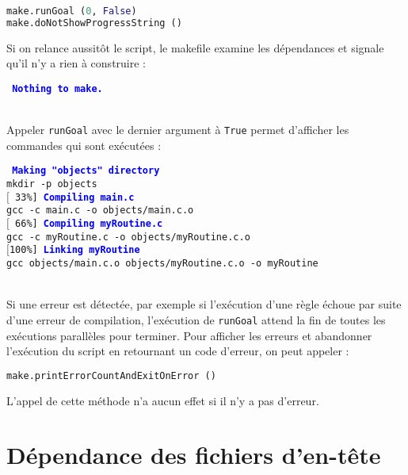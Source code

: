 \documentclass[a4paper,11pt]{extarticle}
\begin{document}
\begin{lstlisting}[language=py]
make.runGoal (0, False)
make.doNotShowProgressString ()
\end{lstlisting}





Si on relance aussitôt le script, le makefile examine les dépendances et signale qu'il n'y a rien à construire :

\begin{mdframed}[hidealllines=true,backgroundcolor=lightgray!20]
\tt\footnotesize
\textcolor{blue}{\bf Nothing to make.}
\end{mdframed}



~\\Appeler \texttt{runGoal} avec le dernier argument à \texttt{True} permet d'afficher les commandes qui sont exécutées :

\begin{mdframed}[hidealllines=true,backgroundcolor=lightgray!20]
\tt\footnotesize
\textcolor{blue}{\bf Making "objects" directory}\\
mkdir -p objects\\
$[$~33\%]~\textcolor{blue}{\bf Compiling main.c}\\
gcc -c main.c -o objects/main.c.o\\
$[$~66\%]~\textcolor{blue}{\bf Compiling myRoutine.c}\\
gcc -c myRoutine.c -o objects/myRoutine.c.o\\
$[$100\%]~\textcolor{blue}{\bf Linking myRoutine}\\
gcc objects/main.c.o objects/myRoutine.c.o -o myRoutine
\end{mdframed}

~\\Si une erreur est détectée, par exemple si l'exécution d'une règle échoue par suite d'une erreur de compilation, l'exécution de \texttt{runGoal} attend la fin de toutes les exécutions parallèles pour terminer. Pour afficher les erreurs et abandonner l'exécution du script en retournant un code d'erreur, on peut appeler :
\begin{lstlisting}[language=py]
make.printErrorCountAndExitOnError ()
\end{lstlisting}
L'appel de cette méthode n'a aucun effet si il n'y a pas d'erreur.

\section{Dépendance des fichiers d'en-tête}
\end{document}
